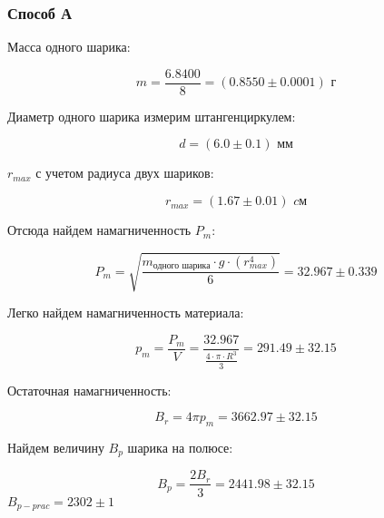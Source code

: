 \documentclass[a4paper]{article}
\begin{document}
\subsubsection{Способ А}
Масса одного шарика:
\begin{center}
    \begin{equation}
        m = \frac{6.8400}{8} = (0.8550 \pm 0.0001) \textit{ г}
    \end{equation}    
\end{center}

Диаметр одного шарика измерим штангенциркулем:
\begin{center}
    \begin{equation}
         d = (6.0 \pm 0.1) \textit{ мм}
    \end{equation}    
\end{center}

$r_{max}$ с учетом радиуса двух шариков:
\begin{center}
    \begin{equation}
         r_{max} = (1.67 \pm 0.01) \textit{ cм}
    \end{equation}    
\end{center}

Отсюда найдем намагниченность $P_m$:
\begin{center}
    \begin{equation}
         P_m = \sqrt{\frac{m_{\textit{одного шарика}} \cdot g \cdot (r_{max}^4)}{6}} = 32.967 \pm 0.339
    \end{equation}    
\end{center}

Легко найдем намагниченность материала:
\begin{center}
    \begin{equation}
         p_m = \frac{P_m}{V} = \frac{32.967}{\frac{4\cdot \pi \cdot R^3}{3}} = 291.49 \pm 32.15
    \end{equation}    
\end{center}

Остаточная намагниченность:
\begin{center}
    \begin{equation}
         B_r =  4\pi p_m = 3662.97 \pm 32.15
    \end{equation}    
\end{center}

Найдем величину $B_p$ шарика на полюсе:
\begin{center}
    \begin{equation}
         B_p = \frac{2B_r}{3} = 2441.98 \pm 32.15
    \end{equation}    
    $B_{p-prac} = 2302 \pm 1 $
\end{center}
\end{document}
